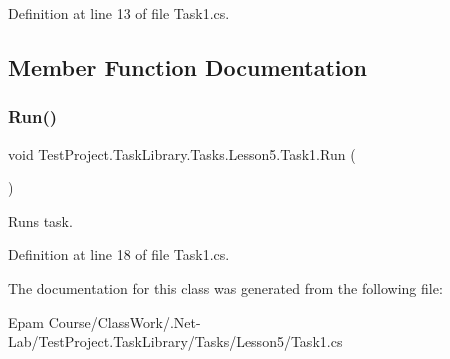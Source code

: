 Definition at line 13 of file Task1.\+cs.



\subsection{Member Function Documentation}
\mbox{\label{class_test_project_1_1_task_library_1_1_tasks_1_1_lesson5_1_1_task1_aeb5f2643ee2d4b8cccdabb332a3ceec1}} 
\subsubsection{\texorpdfstring{Run()}{Run()}}
{\footnotesize\ttfamily void Test\+Project.\+Task\+Library.\+Tasks.\+Lesson5.\+Task1.\+Run (\begin{DoxyParamCaption}{ }\end{DoxyParamCaption})}



Runs task. 



Definition at line 18 of file Task1.\+cs.



The documentation for this class was generated from the following file\+:\begin{DoxyCompactItemize}
\item 
Epam Course/\+Class\+Work/.\+Net-\/\+Lab/\+Test\+Project.\+Task\+Library/\+Tasks/\+Lesson5/Task1.\+cs\end{DoxyCompactItemize}
